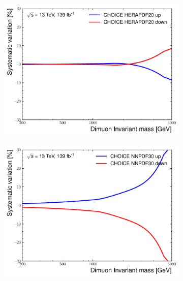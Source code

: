 \begin{figure}[h!]
    \centering
    \begin{subfigure}[b]{0.42\textwidth}
        \centering
        \includegraphics[width=\textwidth]{figures/analysis/datamc/Uncertainties/theory/mm/backgroundTemplate_KF_CHOICE_HERAPDF20.pdf}
        \label{fig:uncert:mmchoiceHERA}
    \end{subfigure}
    \begin{subfigure}[b]{0.42\textwidth}
        \centering
        \includegraphics[width=\textwidth]{figures/analysis/datamc/Uncertainties/theory/mm/backgroundTemplate_KF_CHOICE_NNPDF30.pdf}
        \label{fig:uncert:mmchoiceNNPDF}
    \end{subfigure}

\end{figure}
